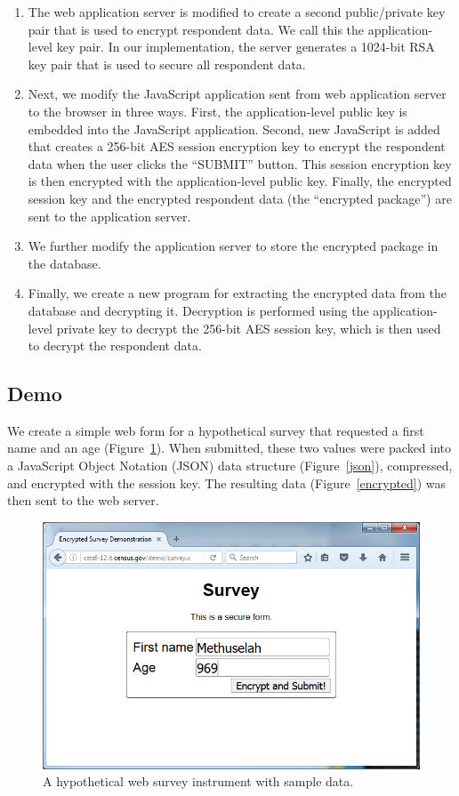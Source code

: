 \documentclass[fleqn,10pt]{wlscirep}
\begin{document}
\begin{enumerate}
\item The web application server is modified to create a second
  public/private key pair that is used to encrypt respondent data. We
  call this the application-level key pair. In our implementation, the
  server generates a 1024-bit RSA key pair that is used to secure all
  respondent data.
\item Next, we modify the JavaScript application sent from web
  application server to the browser in three ways. First, the
  application-level public key is embedded into the JavaScript
  application. Second, new JavaScript is added that creates a 256-bit
  AES session encryption key to encrypt the respondent data when the user clicks the
  ``SUBMIT'' button. This session encryption key is then encrypted
  with the application-level public key. Finally, the encrypted
  session key and the encrypted respondent data (the ``encrypted
  package'') are sent to the
  application server.
\item We further modify the application server to store the encrypted
  package in the database.
\item Finally, we create a new program for extracting the encrypted
  data from the database and decrypting it. Decryption is performed
  using the application-level private key to decrypt the 256-bit AES
  session key, which is then used to decrypt the respondent data.
\end{enumerate}


\subsection{Demo}

We create a simple web form for a hypothetical survey that requested a
first name and an age (Figure~\ref{survey}). When submitted, these two
values were packed into a JavaScript Object Notation (JSON) data
structure (Figure~\ref{json}), compressed, and encrypted with the session key. The
resulting data (Figure~\ref{encrypted}) was then sent to the web server.

\begin{figure}
  \centering
  \includegraphics[width=.5\linewidth]{art/figure1}
  \caption{A hypothetical web survey instrument with sample
    data.}\label{survey}
  \end{figure}
\end{document}
